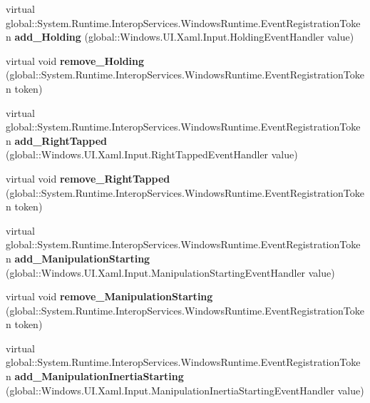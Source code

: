 \begin{DoxyCompactItemize}
virtual global\+::\+System.\+Runtime.\+Interop\+Services.\+Windows\+Runtime.\+Event\+Registration\+Token {\bfseries add\+\_\+\+Holding} (global\+::\+Windows.\+U\+I.\+Xaml.\+Input.\+Holding\+Event\+Handler value)
\item 
\mbox{\label{class_windows_1_1_u_i_1_1_xaml_1_1_u_i_element_a1cb283d7dedbabf394dd0cd9a384d808}} 
virtual void {\bfseries remove\+\_\+\+Holding} (global\+::\+System.\+Runtime.\+Interop\+Services.\+Windows\+Runtime.\+Event\+Registration\+Token token)
\item 
\mbox{\label{class_windows_1_1_u_i_1_1_xaml_1_1_u_i_element_a2013f410a096b8dec9f149c57069520c}} 
virtual global\+::\+System.\+Runtime.\+Interop\+Services.\+Windows\+Runtime.\+Event\+Registration\+Token {\bfseries add\+\_\+\+Right\+Tapped} (global\+::\+Windows.\+U\+I.\+Xaml.\+Input.\+Right\+Tapped\+Event\+Handler value)
\item 
\mbox{\label{class_windows_1_1_u_i_1_1_xaml_1_1_u_i_element_a89eaa447c459a4c2b259272790db23ad}} 
virtual void {\bfseries remove\+\_\+\+Right\+Tapped} (global\+::\+System.\+Runtime.\+Interop\+Services.\+Windows\+Runtime.\+Event\+Registration\+Token token)
\item 
\mbox{\label{class_windows_1_1_u_i_1_1_xaml_1_1_u_i_element_ab2370986b3c9a39fbf279765c5314e6a}} 
virtual global\+::\+System.\+Runtime.\+Interop\+Services.\+Windows\+Runtime.\+Event\+Registration\+Token {\bfseries add\+\_\+\+Manipulation\+Starting} (global\+::\+Windows.\+U\+I.\+Xaml.\+Input.\+Manipulation\+Starting\+Event\+Handler value)
\item 
\mbox{\label{class_windows_1_1_u_i_1_1_xaml_1_1_u_i_element_a6b3fdc2deaa4b4844b6f70ba634a074e}} 
virtual void {\bfseries remove\+\_\+\+Manipulation\+Starting} (global\+::\+System.\+Runtime.\+Interop\+Services.\+Windows\+Runtime.\+Event\+Registration\+Token token)
\item 
\mbox{\label{class_windows_1_1_u_i_1_1_xaml_1_1_u_i_element_a720897f9e46f85c8b896d40d415419c3}} 
virtual global\+::\+System.\+Runtime.\+Interop\+Services.\+Windows\+Runtime.\+Event\+Registration\+Token {\bfseries add\+\_\+\+Manipulation\+Inertia\+Starting} (global\+::\+Windows.\+U\+I.\+Xaml.\+Input.\+Manipulation\+Inertia\+Starting\+Event\+Handler value)

\end{DoxyCompactItemize}
